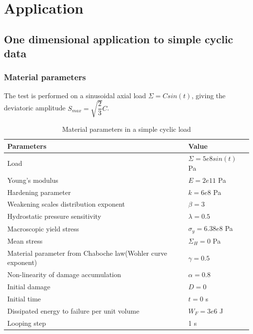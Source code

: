 \documentclass[xcolor=table]{Bredelebeamer}
\begin{document}
\section{Application}
\subsection{One dimensional application to simple cyclic data}

\begin{frame}
	\frametitle{Material parameters}
	The test is performed on a sinusoidal axial load $\Sigma=Csin(t)$, giving the deviatoric amplitude $S_{max}=\sqrt{\dfrac{2}{3}}C$.
\begin{table}[!h]
	\centering
	\begin{tabular}{ll}
		\hline
		\textbf{Parameters}                                         & \textbf{Value}                    \\ \hline
		Load                                                              & $\Sigma=5e8sin(t)$ Pa                  \\
		Young's modulus                                             & $E=2e11$ Pa                       \\
		Hardening parameter                                         &  $k=6e8$ Pa \\
		Weakening scales distribution exponent                      & $\beta=3$                             \\
		Hydrostatic pressure sensitivity                            & $\lambda=0.5$                     \\
		Macroscopic yield stress                                    & $\sigma_y=6.38e8$ Pa              \\
		Mean stress                                        & $\Sigma_H=0$ Pa                     \\
		Material parameter from Chaboche law(Wohler curve exponent) & $\gamma=0.5$                        \\
		Non-linearity of damage accumulation & $\alpha=0.8$                        \\
		Initial damage                                              & $D=0$                          \\
		Initial time                                                & $t=0$ s                            \\
		Dissipated energy to failure per unit volume                & $W_F=3e6$ J                       \\
		Looping step                                           & 1 s              \\ \hline
	\end{tabular}
	\caption{Material parameters in a simple cyclic load }
	\label{Sin}
\end{table}
\end{frame}	
\end{document}
